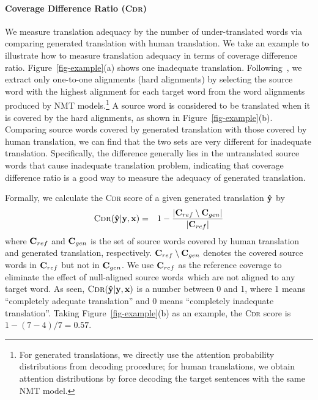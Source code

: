 \documentclass[letterpaper]{article} \usepackage{aaai19}  \usepackage{times}  \usepackage{helvet}  \usepackage{courier}  \usepackage{url}  \usepackage{graphicx}  \frenchspacing  \setlength{\pdfpagewidth}{8.5in}  \setlength{\pdfpageheight}{11in}  \usepackage{amsmath}
\begin{document}
\paragraph{Coverage Difference Ratio (\textsc{Cdr})}
We measure translation adequacy by the number of under-translated words via comparing generated translation with human translation.
We take an example to illustrate how to measure translation adequacy in terms of coverage difference ratio. Figure~\ref{fig-example}(a) shows one inadequate translation.
Following~\cite{luong2015effective,tu2016modeling}, we extract only one-to-one alignments (hard alignments) by selecting the source word with the highest alignment for each target word from the word alignments produced by NMT models.\footnote{For generated translations, we directly use the attention probability distributions from decoding procedure; for human translations, we obtain attention distributions by force decoding the target sentences with the same NMT model.} 
A source word is considered to be translated when it is covered by the hard alignments, as shown in Figure~\ref{fig-example}(b). 
Comparing source words covered by generated translation with those covered by human translation, we can find that the two sets are very different for inadequate translation. Specifically, the difference generally lies in the untranslated source words that cause inadequate translation problem, indicating that coverage difference ratio is a good way to measure the adequacy of generated translation.


Formally, we calculate the \textsc{Cdr} score of a given generated translation ${\bf \hat{y}}$ by
\begin{eqnarray}\label{eqn:utr}
    \textsc{Cdr} ({\bf \hat{y}} | {\bf y}, {\bf x}) &=& 1 - \frac{|{\bf C}_{ref} \setminus {\bf C}_{gen}|}{|{\bf C}_{ref}|}
\end{eqnarray}
where ${\bf C}_{ref}$ and ${\bf C}_{gen}$ is the set of source words covered by human translation and generated translation, respectively. ${\bf C}_{ref}\setminus{\bf C}_{gen}$ denotes the covered source words in ${\bf C}_{ref}$ but not in ${\bf C}_{gen}$. We use ${\bf C}_{ref}$ as the reference coverage to eliminate the effect of null-aligned source words~which are not aligned to any target word. As seen, $\textsc{Cdr} ({\bf \hat{y}} | {\bf y}, {\bf x})$ is a number between 0 and 1, where 1 means ``completely adequate translation'' and 0 means ``completely inadequate translation''. Taking Figure~\ref{fig-example}(b) as an example, the \textsc{Cdr} score is $1-(7-4)/7=0.57$.
\end{document}
